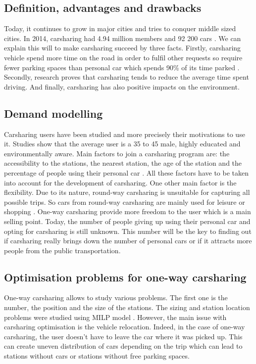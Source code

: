 \begin{bibunit}[ieeetr]
\subsection{Definition, advantages and drawbacks}
Today, it continues to grow in major cities and tries to conquer middle sized cities.
In 2014, carsharing had 4.94 million members and 92 200 cars \cite{frost_strategic_2014}.
We can explain this will to make carsharing succeed by three facts.
Firstly, carsharing vehicle spend more time on the road in order to fulfil other requests so require fewer parking spaces \cite{mitchell_reinventing_2010} than personal car which spends 90\% of its time parked \cite{hu_summary_2004}.
Secondly, research \cite{sioui_carsharing_2013} proves that carsharing tends to reduce the average time spent driving.
And finally, carsharing has also positive impacts on the environment.

\subsection{Demand modelling}
Carsharing users have been studied and more precisely their motivations to use it.
Studies show that the average user is a 35 to 45 male, highly educated and environmentally aware.
Main factors to join a carsharing program are: the accessibility to the stations, the nearest station, the age of the station and the percentage of people using their personal car \cite{jorge_carsharing_2013}.
All these factors have to be taken into account for the development of carsharing.
One other main factor is the flexibility.
Due to its nature, round-way carsharing is unsuitable for capturing all possible trips.
So cars from round-way carsharing are mainly used for leisure or shopping \cite{barth_shared_use_2002, costain_synopsis_2012}.
One-way carsharing provide more freedom to the user which is a main selling point.
Today, the number of people giving up using their personal car and opting for carsharing is still unknown.
This number will be the key to finding out if carsharing really brings down the number of personal cars or if it attracts more people from the public transportation.
 
\subsection{Optimisation problems for one-way carsharing}
One-way carsharing allows to study various problems.
The first one is the number, the position and the size of the stations.
The sizing and station location problems were studied using MILP model \cite{rickenberg_decision_2013}.
However, the main issue with carsharing optimisation is the vehicle relocation.
Indeed, in the case of one-way carsharing, the user doesn't have to leave the car where it was  picked up.
This can create uneven distribution of cars depending on the trip which can lead to stations without cars or stations without free parking spaces.


\end{bibunit}
